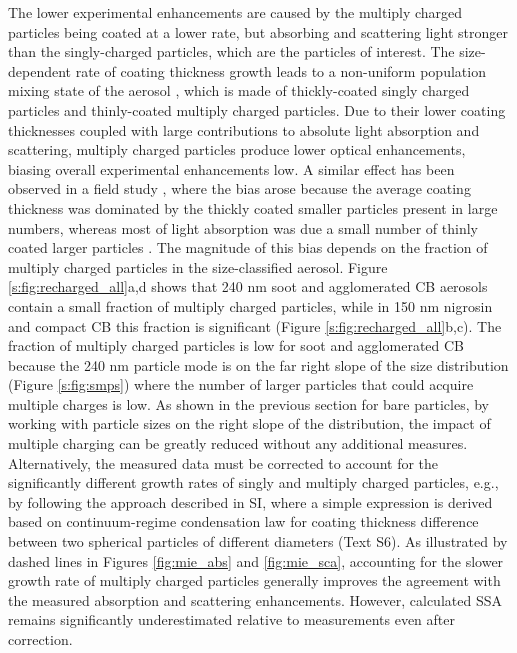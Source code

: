 The lower experimental enhancements are caused by the multiply charged particles being coated at a lower rate, but absorbing and scattering light stronger than the singly-charged particles, which are the particles of interest. The size-dependent rate of coating thickness growth leads to a non-uniform population mixing state of the aerosol \citep{RN75}, which is made of thickly-coated singly charged particles and thinly-coated multiply charged particles. Due to their lower coating thicknesses coupled with large contributions to absolute light absorption and scattering, multiply charged particles produce lower optical enhancements, biasing overall experimental enhancements low. A similar effect has been observed in a field study \citep{RN76}, where the bias arose because the average coating thickness was dominated by the thickly coated smaller particles present in large numbers, whereas most of light absorption was due a small number of thinly coated larger particles \citep{RN52,RN75}. The magnitude of this bias depends on the fraction of multiply charged particles in the size-classified aerosol. Figure \ref{s:fig:recharged_all}a,d shows that 240 nm soot and agglomerated CB aerosols contain a small fraction of multiply charged particles, while in 150 nm nigrosin and compact CB this fraction is significant (Figure \ref{s:fig:recharged_all}b,c). The fraction of multiply charged particles is low for soot and agglomerated CB because the 240 nm particle mode is on the far right slope of the size distribution (Figure \ref{s:fig:smps}) where the number of larger particles that could acquire multiple charges is low. As shown in the previous section for bare particles, by working with particle sizes on the right slope of the distribution, the impact of multiple charging can be greatly reduced without any additional measures. Alternatively, the measured data must be corrected to account for the significantly different growth rates of singly and multiply charged particles, e.g., by following the approach described in SI, where a simple expression is derived based on continuum-regime condensation law for coating thickness difference between two spherical particles of different diameters (Text S6). As illustrated by dashed lines in Figures \ref{fig:mie_abs} and \ref{fig:mie_sca}, accounting for the slower growth rate of multiply charged particles generally improves the agreement with the measured absorption and scattering enhancements. However, calculated SSA remains significantly underestimated relative to measurements even after correction.

